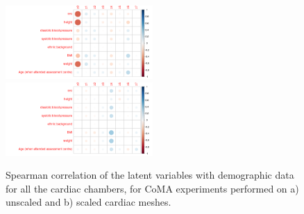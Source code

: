 \begin{figure}[ht!]
\includegraphics[width=0.5\textwidth]{figs/correlation/experiment_2_vs_demographic_data}
\includegraphics[width=0.5\textwidth]{figs/correlation/experiment_1_vs_demographic_data}
\caption{Spearman correlation of the latent variables with demographic data for all the cardiac chambers, for CoMA experiments performed on a) unscaled and b) scaled cardiac meshes.}
\label{fig:relation_to_demographic}
\end{figure}




